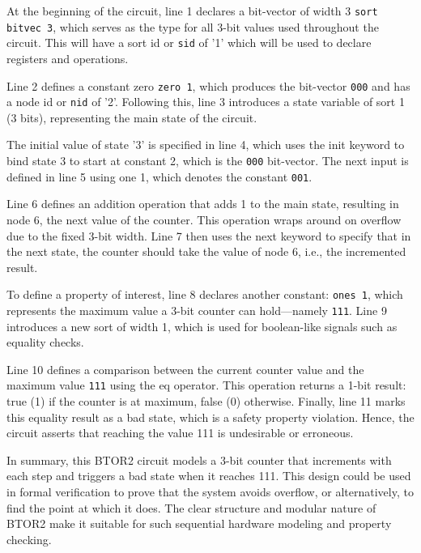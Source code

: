 

At the beginning of the circuit, line 1 declares a bit-vector of width 3 \verb|sort bitvec 3|, which serves as the type for all 3-bit values used throughout the circuit. This will have a sort id or \verb|sid| of '1' which will be used to declare registers and operations.

Line 2 defines a constant zero \verb|zero 1|, which produces the bit-vector \verb|000| and has a node id or \verb|nid| of '2'. Following this, line 3 introduces a state variable of sort 1 (3 bits), representing the main state of the circuit.

The initial value of state '3' is specified in line 4, which uses the init keyword to bind state 3 to start at constant 2, which is the \verb|000| bit-vector. The next input is defined in line 5 using one 1, which denotes the constant \verb|001|.

Line 6 defines an addition operation that adds 1 to the main state, resulting in node 6, the next value of the counter. This operation wraps around on overflow due to the fixed 3-bit width. Line 7 then uses the next keyword to specify that in the next state, the counter should take the value of node 6, i.e., the incremented result.

To define a property of interest, line 8 declares another constant: \verb|ones 1|, which represents the maximum value a 3-bit counter can hold—namely \verb|111|. Line 9 introduces a new sort of width 1, which is used for boolean-like signals such as equality checks.

Line 10 defines a comparison between the current counter value and the maximum value \verb|111| using the eq operator. This operation returns a 1-bit result: true (1) if the counter is at maximum, false (0) otherwise. Finally, line 11 marks this equality result as a bad state, which is a safety property violation. Hence, the circuit asserts that reaching the value 111 is undesirable or erroneous.


In summary, this BTOR2 circuit models a 3-bit counter that increments with each step and triggers a bad state when it reaches 111. This design could be used in formal verification to prove that the system avoids overflow, or alternatively, to find the point at which it does. The clear structure and modular nature of BTOR2 make it suitable for such sequential hardware modeling and property checking.

